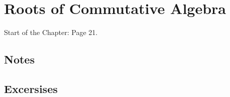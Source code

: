 \documentclass[../../CAwaVTAG-notes.tex]{subfiles}
\begin{document}
    \section{Roots of Commutative Algebra}
    
    Start of the Chapter: Page 21.

    \subsection{Notes}
    

    \subsection{Excersises}
\end{document}
